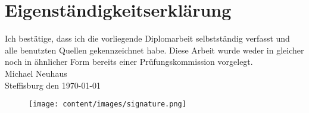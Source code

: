 \section{Eigenständigkeitserklärung}
Ich bestätige, dass ich die vorliegende Diplomarbeit selbstständig verfasst und alle benutzten Quellen gekennzeichnet habe. Diese Arbeit wurde weder in gleicher noch in ähnlicher Form bereits einer Prüfungskommission vorgelegt.\\

\vspace{0.7cm}
Michael Neuhaus\\

\vspace{3mm}
Steffisburg den \today\\

\vspace{-1.2cm}
\begin{figure}[H]
  \texttt{[image: content/images/signature.png]}
\end{figure}